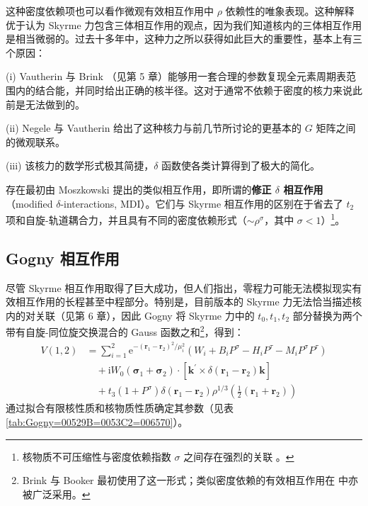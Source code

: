 这种密度依赖项也可以看作微观有效相互作用中 $\rho$ 依赖性的唯象表现。这种解释优于认为 Skyrme 力包含三体相互作用的观点，因为我们知道核内的三体相互作用是相当微弱的。过去十多年中，这种力之所以获得如此巨大的重要性，基本上有三个原因：

(i) Vautherin 与 Brink \cite{VB72}（见第 5 章）能够用一套合理的参数复现全元素周期表范围内的结合能，并同时给出正确的核半径。这对于通常不依赖于密度的核力来说此前是无法做到的。

(ii) Negele 与 Vautherin \cite{NV72} 给出了这种核力与前几节所讨论的更基本的 $G$ 矩阵之间的微观联系。

(iii) 该核力的数学形式极其简捷，$\delta$ 函数使各类计算得到了极大的简化。

存在最初由 Moszkowski \cite{Mo70} 提出的类似相互作用，即所谓的\textbf{修正 $\delta$ 相互作用}（modified
$\delta$-interactions, MDI）。它们与 Skyrme 相互作用的区别在于省去了 $t_{2}$ 项和自旋-轨道耦合力，并且具有不同的密度依赖形式（$\sim\rho^{\sigma}$，其中
$\sigma<1$）\footnote{核物质不可压缩性与密度依赖指数 $\sigma$ 之间存在强烈的关联 \cite{CS72}。}。

\subsection{Gogny 相互作用}

尽管 Skyrme 相互作用取得了巨大成功，但人们指出，零程力可能无法模拟现实有效相互作用的长程甚至中程部分。特别是，目前版本的 Skyrme
力无法恰当描述核内的对关联（见第 6 章），因此 Gogny \cite{Go75b} 将 Skyrme 力中的 $t_{0},t_{1},t_{2}$
部分替换为两个带有自旋-同位旋交换混合的 Gauss 函数之和\footnote{Brink 与 Booker \cite{BB67} 最初使用了这一形式；类似密度依赖的有效相互作用在 \cite{Kr70,ZR71,RPS72,LMV73,RBP77}
中亦被广泛采用。}，得到：
\begin{align}
V(1,2) & =\sum^{2}_{i=1}\mathrm{e}^{-(\boldsymbol{r}_{1}-\boldsymbol{r}_{2})^{2}/\mu^{2}_{i}}(W_{i}+B_{i}P^{\sigma}-H_{i}P^{\tau}-M_{i}P^{\sigma}P^{\tau})\nonumber \\
 & \quad+\mathrm{i}W_{0}(\boldsymbol{\sigma}_{1}+\boldsymbol{\sigma}_{2})\cdot[\boldsymbol{k}^{\prime}\times\delta(\boldsymbol{r}_{1}-\boldsymbol{r}_{2})\boldsymbol{k}]\nonumber \\
 & \quad+t_{3}(1+P^{\sigma})\delta(\boldsymbol{r}_{1}-\boldsymbol{r}_{2})\rho^{1/3}\left(\frac{1}{2}(\boldsymbol{r}_{1}+\boldsymbol{r}_{2})\right)\label{eq:4.110}
\end{align}
通过拟合有限核性质和核物质性质确定其参数（见表 \ref{tab:Gogny=00529B=0053C2=006570}）。

